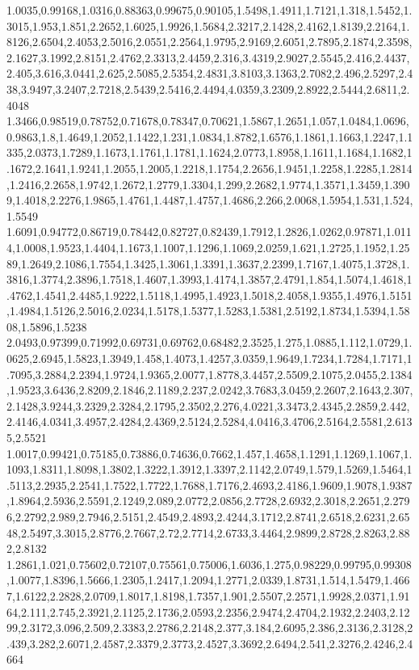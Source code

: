 1.0035,0.99168,1.0316,0.88363,0.99675,0.90105,1.5498,1.4911,1.7121,1.318,1.5452,1.3015,1.953,1.851,2.2652,1.6025,1.9926,1.5684,2.3217,2.1428,2.4162,1.8139,2.2164,1.8126,2.6504,2.4053,2.5016,2.0551,2.2564,1.9795,2.9169,2.6051,2.7895,2.1874,2.3598,2.1627,3.1992,2.8151,2.4762,2.3313,2.4459,2.316,3.4319,2.9027,2.5545,2.416,2.4437,2.405,3.616,3.0441,2.625,2.5085,2.5354,2.4831,3.8103,3.1363,2.7082,2.496,2.5297,2.438,3.9497,3.2407,2.7218,2.5439,2.5416,2.4494,4.0359,3.2309,2.8922,2.5444,2.6811,2.4048
1.3466,0.98519,0.78752,0.71678,0.78347,0.70621,1.5867,1.2651,1.057,1.0484,1.0696,0.9863,1.8,1.4649,1.2052,1.1422,1.231,1.0834,1.8782,1.6576,1.1861,1.1663,1.2247,1.1335,2.0373,1.7289,1.1673,1.1761,1.1781,1.1624,2.0773,1.8958,1.1611,1.1684,1.1682,1.1672,2.1641,1.9241,1.2055,1.2005,1.2218,1.1754,2.2656,1.9451,1.2258,1.2285,1.2814,1.2416,2.2658,1.9742,1.2672,1.2779,1.3304,1.299,2.2682,1.9774,1.3571,1.3459,1.3909,1.4018,2.2276,1.9865,1.4761,1.4487,1.4757,1.4686,2.266,2.0068,1.5954,1.531,1.524,1.5549
1.6091,0.94772,0.86719,0.78442,0.82727,0.82439,1.7912,1.2826,1.0262,0.97871,1.0114,1.0008,1.9523,1.4404,1.1673,1.1007,1.1296,1.1069,2.0259,1.621,1.2725,1.1952,1.2589,1.2649,2.1086,1.7554,1.3425,1.3061,1.3391,1.3637,2.2399,1.7167,1.4075,1.3728,1.3816,1.3774,2.3896,1.7518,1.4607,1.3993,1.4174,1.3857,2.4791,1.854,1.5074,1.4618,1.4762,1.4541,2.4485,1.9222,1.5118,1.4995,1.4923,1.5018,2.4058,1.9355,1.4976,1.5151,1.4984,1.5126,2.5016,2.0234,1.5178,1.5377,1.5283,1.5381,2.5192,1.8734,1.5394,1.5808,1.5896,1.5238
2.0493,0.97399,0.71992,0.69731,0.69762,0.68482,2.3525,1.275,1.0885,1.112,1.0729,1.0625,2.6945,1.5823,1.3949,1.458,1.4073,1.4257,3.0359,1.9649,1.7234,1.7284,1.7171,1.7095,3.2884,2.2394,1.9724,1.9365,2.0077,1.8778,3.4457,2.5509,2.1075,2.0455,2.1384,1.9523,3.6436,2.8209,2.1846,2.1189,2.237,2.0242,3.7683,3.0459,2.2607,2.1643,2.307,2.1428,3.9244,3.2329,2.3284,2.1795,2.3502,2.276,4.0221,3.3473,2.4345,2.2859,2.442,2.4146,4.0341,3.4957,2.4284,2.4369,2.5124,2.5284,4.0416,3.4706,2.5164,2.5581,2.6135,2.5521
1.0017,0.99421,0.75185,0.73886,0.74636,0.7662,1.457,1.4658,1.1291,1.1269,1.1067,1.1093,1.8311,1.8098,1.3802,1.3222,1.3912,1.3397,2.1142,2.0749,1.579,1.5269,1.5464,1.5113,2.2935,2.2541,1.7522,1.7722,1.7688,1.7176,2.4693,2.4186,1.9609,1.9078,1.9387,1.8964,2.5936,2.5591,2.1249,2.089,2.0772,2.0856,2.7728,2.6932,2.3018,2.2651,2.2796,2.2792,2.989,2.7946,2.5151,2.4549,2.4893,2.4244,3.1712,2.8741,2.6518,2.6231,2.6548,2.5497,3.3015,2.8776,2.7667,2.72,2.7714,2.6733,3.4464,2.9899,2.8728,2.8263,2.882,2.8132
1.2861,1.021,0.75602,0.72107,0.75561,0.75006,1.6036,1.275,0.98229,0.99795,0.99308,1.0077,1.8396,1.5666,1.2305,1.2417,1.2094,1.2771,2.0339,1.8731,1.514,1.5479,1.4667,1.6122,2.2828,2.0709,1.8017,1.8198,1.7357,1.901,2.5507,2.2571,1.9928,2.0371,1.9164,2.111,2.745,2.3921,2.1125,2.1736,2.0593,2.2356,2.9474,2.4704,2.1932,2.2403,2.1299,2.3172,3.096,2.509,2.3383,2.2786,2.2148,2.377,3.184,2.6095,2.386,2.3136,2.3128,2.439,3.282,2.6071,2.4587,2.3379,2.3773,2.4527,3.3692,2.6494,2.541,2.3276,2.4246,2.4664
